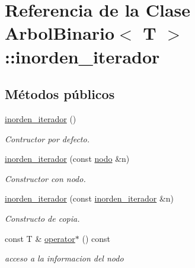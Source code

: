 \hypertarget{classArbolBinario_1_1inorden__iterador}{}\section{Referencia de la Clase Arbol\+Binario$<$ T $>$\+:\+:inorden\+\_\+iterador}
\label{classArbolBinario_1_1inorden__iterador}
\subsection*{Métodos públicos}
\begin{DoxyCompactItemize}
\item 
\mbox{\label{classArbolBinario_1_1inorden__iterador_a4d7a32537f0d10c0c7f8c069724a4226}} 
\hyperlink{classArbolBinario_1_1inorden__iterador_a4d7a32537f0d10c0c7f8c069724a4226}{inorden\+\_\+iterador} ()
\begin{DoxyCompactList}\small\item\em Contructor por defecto. \end{DoxyCompactList}\item 
\hyperlink{classArbolBinario_1_1inorden__iterador_afd45e81f9c3c521104938227b17316a9}{inorden\+\_\+iterador} (const \hyperlink{classArbolBinario_1_1nodo}{nodo} \&n)
\begin{DoxyCompactList}\small\item\em Constructor con nodo. \end{DoxyCompactList}\item 
\hyperlink{classArbolBinario_1_1inorden__iterador_ac253108ace744471eb4e64278a44071a}{inorden\+\_\+iterador} (const \hyperlink{classArbolBinario_1_1inorden__iterador}{inorden\+\_\+iterador} \&n)
\begin{DoxyCompactList}\small\item\em Constructo de copia. \end{DoxyCompactList}\item 
\mbox{\label{classArbolBinario_1_1inorden__iterador_a912ac0406b2e17bc49baf1321b2609ce}} 
const T \& \hyperlink{classArbolBinario_1_1inorden__iterador_a912ac0406b2e17bc49baf1321b2609ce}{operator$\ast$} () const
\begin{DoxyCompactList}\small\item\em acceso a la informacion del nodo \end{DoxyCompactList}\item 

\end{DoxyCompactItemize}
